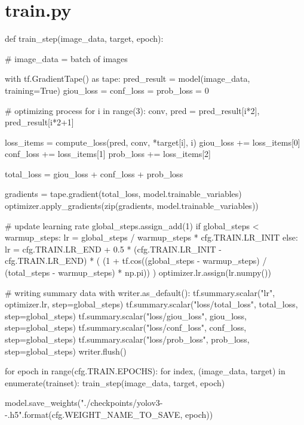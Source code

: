 \documentclass[10pt,a4paper]{article}
\begin{document}
\section{train.py}

\begin{py}
def train_step(image_data, target, epoch):

    # image_data = batch of images

    with tf.GradientTape() as tape:
        pred_result = model(image_data, training=True)
        giou_loss = conf_loss = prob_loss = 0

        # optimizing process
        for i in range(3):
            conv, pred = pred_result[i*2], pred_result[i*2+1]

            loss_items = compute_loss(pred, conv, *target[i], i)
            giou_loss += loss_items[0]
            conf_loss += loss_items[1]
            prob_loss += loss_items[2]

        total_loss = giou_loss + conf_loss + prob_loss

        gradients = tape.gradient(total_loss, model.trainable_variables)
        optimizer.apply_gradients(zip(gradients, model.trainable_variables))

        # update learning rate
        global_steps.assign_add(1)
        if global_steps < warmup_steps:
            lr = global_steps / warmup_steps * cfg.TRAIN.LR_INIT
        else:
            lr = cfg.TRAIN.LR_END + 0.5 * (cfg.TRAIN.LR_INIT - cfg.TRAIN.LR_END) * (
                (1 + tf.cos((global_steps - warmup_steps) / (total_steps - warmup_steps) * np.pi))
            )
        optimizer.lr.assign(lr.numpy())

        # writing summary data
        with writer.as_default():
            tf.summary.scalar("lr", optimizer.lr, step=global_steps)
            tf.summary.scalar("loss/total_loss", total_loss, step=global_steps)
            tf.summary.scalar("loss/giou_loss", giou_loss, step=global_steps)
            tf.summary.scalar("loss/conf_loss", conf_loss, step=global_steps)
            tf.summary.scalar("loss/prob_loss", prob_loss, step=global_steps)
        writer.flush()


for epoch in range(cfg.TRAIN.EPOCHS):
    for index, (image_data, target) in enumerate(trainset):
        train_step(image_data, target, epoch)

    model.save_weights("./checkpoints/yolov3-{}-{}.h5".format(cfg.WEIGHT_NAME_TO_SAVE, epoch))
\end{py}
\end{document}
